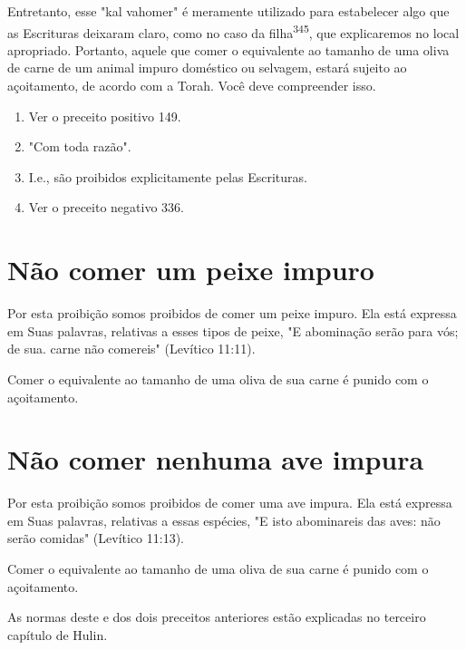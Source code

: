 \begin{itemize}
\begin{enumrate}
\begin{itemize}
\begin{itemize}
\begin{itemize}
Entretanto, esse "kal vahomer" é meramente utilizado para esta­belecer
algo que as Escrituras deixaram claro, como no caso da
filha\textsuperscript{345}, que explicaremos no local apropriado.
Portanto, aquele que comer o equivalente ao tamanho de uma oliva de
carne de um animal impuro doméstico ou selva­gem, estará sujeito ao
açoitamento, de acordo com a Torah. Você deve com­preender isso.


\begin{enumerate}
\def\labelenumi{\arabic{enumi}.}
\setcounter{enumi}{341}
\item
 
 Ver o preceito positivo 149.
 
\item
 
 "Com toda razão".
 
\item
 
 I.e., são proibidos explicitamente pelas Escrituras.
 
\item
 
 Ver o preceito negativo 336.
 
\end{enumerate}



\section{Não comer um peixe impuro}

Por esta proibição somos proibidos de comer um peixe impuro. Ela está
expressa em Suas palavras, relativas a esses tipos de peixe, "E
abominação serão para vós; de sua. carne não comereis" (Levítico 11:11).

Comer o equivalente ao tamanho de uma oliva de sua carne é puni­do com o
açoitamento.

\section{Não comer nenhuma ave impura}

Por esta proibição somos proibidos de comer uma ave impura. Ela está
expressa em Suas palavras, relativas a essas espécies, "E isto
abominareis das aves: não serão comidas" (Levítico 11:13).

Comer o equivalente ao tamanho de uma oliva de sua carne é puni­do com o
açoitamento.

As normas deste e dos dois preceitos anteriores estão explicadas no
terceiro capítulo de Hulin.


\end{itemize}
\end{itemize}
\end{itemize}
\end{enumrate}
\end{itemize}
